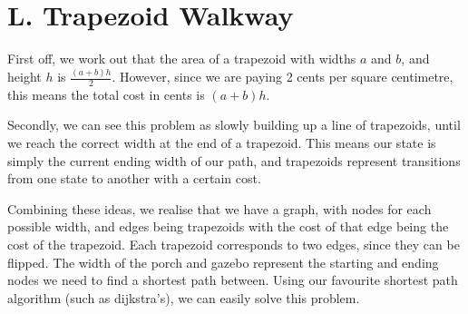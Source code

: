 \section*{L. Trapezoid Walkway}

First off, we work out that the area of a trapezoid with widths $a$ and $b$, and height $h$ is $\frac{(a + b)h}{2}$. However, since we are paying 2 cents per square centimetre, this means the total cost in cents is $(a + b)h$.

Secondly, we can see this problem as slowly building up a line of trapezoids, until we reach the correct width at the end of a trapezoid. This means our state is simply the current ending width of our path, and trapezoids represent transitions from one state to another with a certain cost.

Combining these ideas, we realise that we have a graph, with nodes for each possible width, and edges being trapezoids with the cost of that edge being the cost of the trapezoid. Each trapezoid corresponds to two edges, since they can be flipped. The width of the porch and gazebo represent the starting and ending nodes we need to find a shortest path between. Using our favourite shortest path algorithm (such as dijkstra's), we can easily solve this problem.